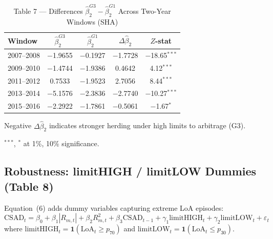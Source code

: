 \documentclass[12pt, a4paper]{article}
\newcommand{\CSAD}{\mathrm{CSAD}}
\begin{document}
\begin{table}[H]
  \centering
  \caption{Table 7 — Differences $\hat\beta_2^{G3} - \hat\beta_2^{G1}$ Across Two-Year Windows (SHA)}
  \label{tab:hl_diff}
  \begin{threeparttable}
  \begin{tabular}{lcccc}
    \toprule
    Window & $\hat\beta_2^{G3}$ & $\hat\beta_2^{G1}$ & $\Delta\hat\beta_2$ & $Z$-stat \\
    \midrule
    2007--2008 & $-$1.9655 & $-$0.1927 & $-$1.7728 & $-$18.65$^{***}$ \\
    2009--2010 & $-$1.4744 & $-$1.9386 &  0.4642   &  4.12$^{***}$  \\
    2011--2012 &  0.7533   & $-$1.9523 &  2.7056   &  8.44$^{***}$  \\
    2013--2014 & $-$5.1576 & $-$2.3836 & $-$2.7740 & $-$10.27$^{***}$ \\
    2015--2016 & $-$2.2922 & $-$1.7861 & $-$0.5061 & $-$1.67$^{*}$  \\
    \bottomrule
  \end{tabular}
  \begin{tablenotes}
    \footnotesize
    \item Negative $\Delta\hat\beta_2$ indicates stronger herding under high limits to arbitrage (G3).
    \item $^{***}$, $^{*}$ at 1\%, 10\% significance.
  \end{tablenotes}
  \end{threeparttable}
\end{table}

\subsection{Robustness: limitHIGH / limitLOW Dummies (Table 8)}

Equation~(6) adds dummy variables capturing extreme LoA episodes:
\begin{equation}
  \CSAD_t = \beta_0 + \beta_1 |R_{m,t}| + \beta_2 R_{m,t}^2 + \beta_3 \CSAD_{t-1}
           + \gamma_1 \mathrm{limitHIGH}_t + \gamma_2 \mathrm{limitLOW}_t + \varepsilon_t
\end{equation}
where $\mathrm{limitHIGH}_t = \mathbf{1}(\mathrm{LoA}_t \geq p_{70})$ and $\mathrm{limitLOW}_t = \mathbf{1}(\mathrm{LoA}_t \leq p_{30})$.
\end{document}
